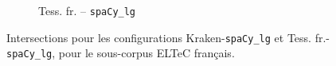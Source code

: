 \begin{figure}[h!]
\begin{minipage}{7cm}
\begin{subfigure}{1\textwidth}
  \caption{Tess. fr. -- \texttt{spaCy\_lg}}
  \end{subfigure}
    \end{minipage}
\caption{Intersections pour les configurations Kraken-\texttt{spaCy\_lg} et Tess. fr.-\texttt{spaCy\_lg}, pour le sous-corpus ELTeC français.}
\label{fig:intersection_globale-kraken-tess}
\end{figure}


